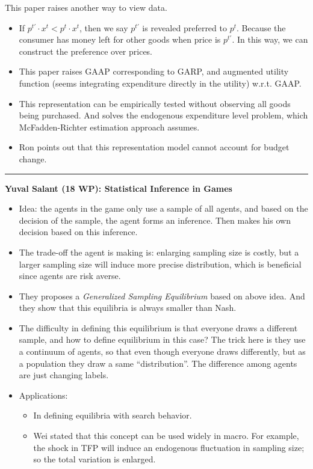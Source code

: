 \documentclass{book}
\theoremstyle{plain}
\theoremstyle{definition}
\newcommand{\myline}{\vspace{3mm} \hrule \vspace{4mm}}
\begin{document}
This paper raises another way to view data.
\begin{itemize}
	\item If $p^{t'}\cdot x^t < p^t \cdot x^t$, then we say $p^{t'}$ is revealed preferred to $p^t$.
	Because the consumer has money left for other goods when price is $p^{t'}$. 
	In this way, we can construct the preference over prices.
	\item This paper raises GAAP corresponding to GARP,
	and augmented utility function (seems integrating expenditure directly in the utility) w.r.t. GAAP.
	\item This representation can be empirically tested without observing all goods being purchased.
	And solves the endogenous expenditure level problem,
	which McFadden-Richter estimation approach assumes.
	\item Ron points out that this representation model cannot account for budget change.
\end{itemize}


\myline

\noindent
\textbf{Yuval Salant (18 WP): Statistical Inference in Games}

\begin{itemize}
	\item Idea: the agents in the game only use a sample of all agents, and based on the decision of the sample, the agent forms an inference. Then makes his own decision based on this inference.

	\item The trade-off the agent is making is: enlarging sampling size is costly, but a larger sampling size will induce more precise distribution, which is beneficial since agents are risk averse.

	\item They proposes a \textit{Generalized Sampling Equilibrium} based on above idea. And they show that this equilibria is always smaller than Nash.

	\item The difficulty in defining this equilibrium is that everyone draws a different sample, and how to define equilibrium in this case? The trick here is they use a continuum of agents, so that even though everyone draws differently, but as a population they draw a same ``distribution''. The difference among agents are just changing labels.

	\item Applications:
	\begin{itemize}
		\item In defining equilibria with search behavior.

		\item Wei stated that this concept can be used widely in macro. For example, the shock in TFP will induce an endogenous fluctuation in sampling size; so the total variation is enlarged.
	\end{itemize}
\end{itemize}
\end{document}
